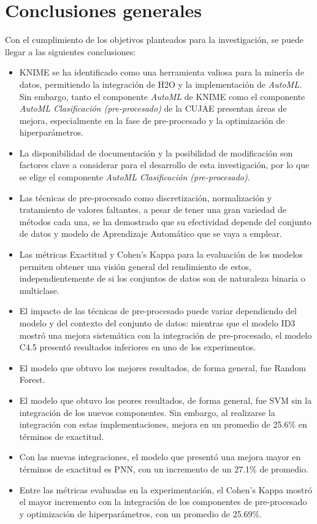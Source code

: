 \chapter*{Conclusiones generales}
Con el cumplimiento de los objetivos planteados para la investigación, se puede llegar a las siguientes conclusiones:
\begin{itemize}
	\item KNIME se ha identificado como una herramienta valiosa para la minería de datos, permitiendo la integración de H2O y la implementación de \textit{AutoML}. Sin embargo, tanto el componente \textit{AutoML} de KNIME como el componente \textit{AutoML Clasificación (pre-procesado)} de la CUJAE presentan áreas de mejora, especialmente en la fase de pre-procesado y la optimización de hiperparámetros.
	\item La disponibilidad de documentación y la posibilidad de modificación son factores clave a considerar para el desarrollo de esta investigación, por lo que se elige el componente \textit{AutoML Clasificación (pre-procesado)}.
	\item Las técnicas de pre-procesado como discretización, normalización y tratamiento de valores faltantes, a pesar de tener una gran variedad de métodos cada una, se ha demostrado que su efectividad depende del conjunto de datos y modelo de Aprendizaje Automático que se vaya a emplear.
	\item Las métricas Exactitud y Cohen's Kappa para la evaluación de los modelos permiten obtener una visión general del rendimiento de estos, independientemente de si los conjuntos de datos son de naturaleza binaria o multiclase.
	\item El impacto de las técnicas de pre-procesado puede variar dependiendo del modelo y del contexto del conjunto de datos: mientras que el modelo ID3 mostró una mejora sistemática con la integración de pre-procesado, el modelo C4.5 presentó resultados inferiores en uno de los experimentos.
	\item El modelo que obtuvo los mejores resultados, de forma general, fue Random Forest.
	\item El modelo que obtuvo los peores resultados, de forma general, fue SVM sin la integración de los nuevos componentes. Sin embargo, al realizarse la integración con estas implementaciones, mejora en un promedio de 25.6\% en términos de exactitud.
	\item Con las nuevas integraciones, el modelo que presentó una mejora mayor en términos de exactitud es PNN, con un incremento de un 27.1\% de promedio.
	\item Entre las métricas evaluadas en la experimentación, el Cohen’s Kappa mostró el mayor incremento con la integración de los componentes de pre-procesado y optimización de hiperparámetros, con un promedio de 25.69\%.
\end{itemize}